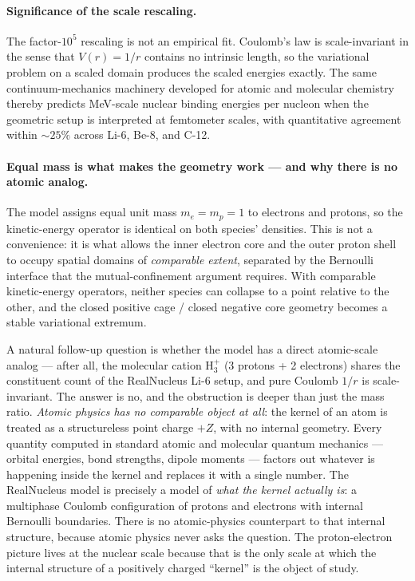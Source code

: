 \documentclass[11pt]{article}
\begin{document}
\paragraph{Significance of the scale rescaling.}
The factor-$10^5$ rescaling is not an empirical fit. Coulomb's law is scale-invariant in the sense that $V(r) = 1/r$ contains no intrinsic length, so the variational problem on a scaled domain produces the scaled energies exactly. The same continuum-mechanics machinery developed for atomic and molecular chemistry thereby predicts MeV-scale nuclear binding energies per nucleon when the geometric setup is interpreted at femtometer scales, with quantitative agreement within $\sim 25\%$ across Li-6, Be-8, and C-12.

\paragraph{Equal mass is what makes the geometry work --- and why there is no atomic analog.}
The model assigns equal unit mass $m_e = m_p = 1$ to electrons and protons, so the kinetic-energy operator is identical on both species' densities. This is not a convenience: it is what allows the inner electron core and the outer proton shell to occupy spatial domains of \emph{comparable extent}, separated by the Bernoulli interface that the mutual-confinement argument requires. With comparable kinetic-energy operators, neither species can collapse to a point relative to the other, and the closed positive cage / closed negative core geometry becomes a stable variational extremum.

A natural follow-up question is whether the model has a direct atomic-scale analog --- after all, the molecular cation $\mathrm{H_3^+}$ (3 protons + 2 electrons) shares the constituent count of the RealNucleus Li-6 setup, and pure Coulomb $1/r$ is scale-invariant. The answer is no, and the obstruction is deeper than just the mass ratio. \emph{Atomic physics has no comparable object at all}: the kernel of an atom is treated as a structureless point charge $+Z$, with no internal geometry. Every quantity computed in standard atomic and molecular quantum mechanics --- orbital energies, bond strengths, dipole moments --- factors out whatever is happening inside the kernel and replaces it with a single number. The RealNucleus model is precisely a model of \emph{what the kernel actually is}: a multiphase Coulomb configuration of protons and electrons with internal Bernoulli boundaries. There is no atomic-physics counterpart to that internal structure, because atomic physics never asks the question. The proton-electron picture lives at the nuclear scale because that is the only scale at which the internal structure of a positively charged ``kernel'' is the object of study.
\end{document}
